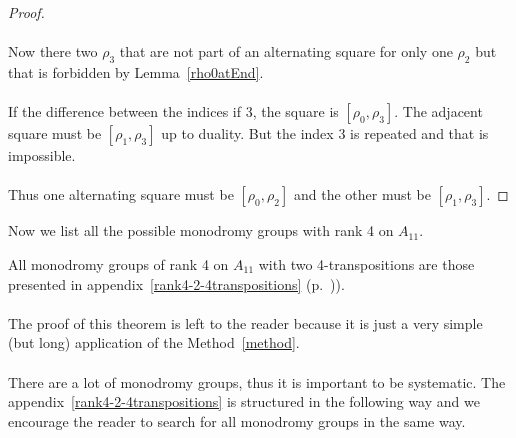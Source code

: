 \begin{proof}
\begin{figure}[H]
\begin{center}
\begin{tikzpicture}[scale=.8]
      \end{tikzpicture}
      \caption{}
    \end{center}
  \end{figure}

  \paragraph{}
  Now there two $\rho_3$ that are not part of an alternating square for only one $\rho_2$ but that is forbidden by Lemma~\ref{rho0atEnd}.

  \paragraph{}
  If the difference between the indices if 3, the square is $[\rho_0, \rho_3]$. The adjacent square must be $[\rho_1, \rho_3]$ up to duality. But the index $3$ is repeated and that is impossible.

  \paragraph{}
  Thus one alternating square must be $[\rho_0, \rho_2]$ and the other must be $[\rho_1, \rho_3]$.

\end{proof}

Now we list all the possible monodromy groups with rank 4 on $A_{11}$.

\begin{theorem}
  All monodromy groups of rank 4 on $A_{11}$ with two 4-transpositions are those presented in appendix~\ref{rank4-2-4transpositions} (p.~\pageref{rank4-2-4transpositions})).
\end{theorem}

\paragraph{}
The proof of this theorem is left to the reader because it is just a very simple (but long) application of the Method~\ref{method}.

\paragraph{}
There are a lot of monodromy groups, thus it is important to be systematic. The appendix~\ref{rank4-2-4transpositions} is structured in the following way and we encourage the reader to search for all monodromy groups in the same way.

